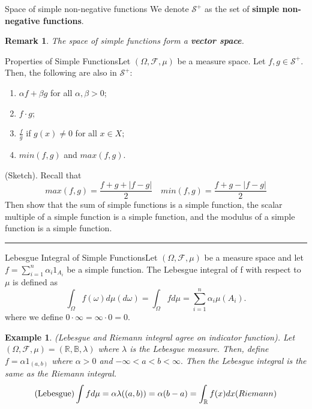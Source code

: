 \documentclass[twoside]{article}
\newtheorem{remark}[theorem]{Remark}
\newtheorem{example}[theorem]{Example}
\newenvironment{proof}{{\bf Proof:}}{\hfill\rule{2mm}{2mm}}
\newcommand{\sigmalgebra}{\mathcal{F}}
\begin{document}
\begin{definition_exam}{Space of simple non-negative functions}{} We denote $\mathcal{S}^+$ as the set of \textbf{simple non-negative functions}.
\end{definition_exam}

\begin{remark}The space of simple functions form a \textbf{vector space}.
\end{remark}

\begin{proposition_exam}{Properties of Simple Functions}{}Let $(\Omega, \mathcal{F}, \mu)$ be a measure space. Let $f, g \in \mathcal{S}^+$. Then, the following are also in $\mathcal{S}^+$:
\begin{enumerate}
\item $\alpha f + \beta g$ for all $\alpha, \beta > 0$;
\item $f \cdot g$;
\item $\frac{f}{g}$ if $g(x) \neq 0$ for all $x \in X;$
\item $min(f,g)$ and $max(f,g)$.
\end{enumerate}

\end{proposition_exam}

\begin{proof}(Sketch). 
Recall that 
$$
max(f,g) = \frac{f + g + |f - g|}{2} \quad min(f,g) = \frac{f + g - |f - g|}{2}
$$
Then show that the sum of simple functions is a simple function, the scalar multiple of a simple function is a simple function, and the modulus of a simple function is a simple function.
\end{proof}



\begin{definition_exam}{Lebesgue Integral of Simple Functions}{}Let $(\Omega, \sigmalgebra, \mu)$ be a measure space and let $f = \sum_{i=1}^{n}\alpha_i 1_{A_{i}}$ be a simple function. The Lebesgue integral of f with respect to $\mu$ is defined as 
$$
\int_{\Omega} f(\omega)d\mu(d \omega) = \int_{\Omega}fd\mu = \sum_{i=1}^n\alpha_i\mu(A_i).
$$
where we define $0 \cdot \infty = \infty \cdot 0 = 0.$
\end{definition_exam}


\begin{example}(Lebesgue and Riemann integral agree on indicator function). Let $(\Omega, \sigmalgebra, \mu) = (\mathbb{R}, \mathbb{B}, \lambda)$ where $\lambda$ is the Lebesgue measure. Then, define $f = \alpha 1_{(a,b)}$ where $\alpha > 0$ and $-\infty < a < b < \infty.$ Then the Lebesgue integral is the same as the Riemann integral.
$$
\text{(Lebesgue)} \int fd\mu = \alpha \lambda((a,b)) = \alpha(b - a) = \int_{\mathbb{R}}f(x)dx \text(Riemann)
$$
\end{example}
\end{document}
